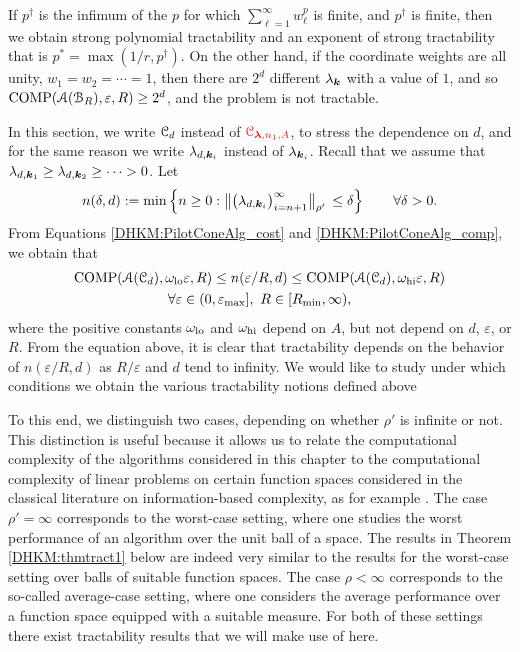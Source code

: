 \documentclass[USenglish]{article}
\theoremstyle{dgthm}
\theoremstyle{dgthm}
\theoremstyle{dgthm}
\theoremstyle{dgthm}
\theoremstyle{dgdef}
\theoremstyle{definition}
\DeclareMathOperator{\COMP}{COMP}
\newcommand{\bignorm}[2][{}]{\ensuremath{\bigl \lVert #2 \bigr \rVert}_{#1}}
\newcommand{\DHKMchange}[1]{{\color{red}{#1}}}
\begin{document}
{If $p^\dagger$ is the infimum of the $p$ for which $\sum_{\ell = 1}^{\infty} w_\ell^{p}$ is finite, and $p^\dagger$ is finite, then we obtain strong polynomial tractability and an exponent of strong tractability that is $p^* = \max(1/r,p^\dagger)$. On the other hand, if the coordinate weights are all unity,  $w_1 = w_2 = \cdots = 1$, then there are $2^d$ different $\lambda_{{\boldsymbol{k}}}$ with a value of $1$, and so $\COMP(\calA(\calB_{R}),\varepsilon,R) \ge 2^d$, and the problem is not tractable.
}

In this section, we write ${\mathcal{C}}_d$ instead of $\DHKMchange{\calC_{\boldsymbol{\lambda},n_1,A}}$, to stress the dependence on $d$, and for the same reason we write $\lambda_{d,{\boldsymbol{k}}_i}$ instead of $\lambda_{{\boldsymbol{k}}_i}$. Recall that we assume that 
$\lambda_{d,{\boldsymbol{k}}_1}\geq \lambda_{d,{\boldsymbol{k}}_2}\geq \cdots >0$. Let 
\[
n(\delta,d) :=\min \left \{n\ge 0: \bignorm[\rho']{\bigl(  \lambda_{d,\bsk_i}  \bigr)_{i = n+1}^{\infty}} \,
    \le \delta \right \} \qquad \forall \delta > 0.
\]
From 
Equations \eqref{DHKM:PilotConeAlg_cost} and \eqref{DHKM:PilotConeAlg_comp}, we obtain that 
\begin{multline*}
     \COMP(\calA(\calC_d),\omega_{\textup{lo}} \varepsilon,R) \le n(\varepsilon/R,d) \le 
        \COMP(\calA(\calC_d),\omega_{\textup{hi}} \varepsilon,R)  \\
        \forall \varepsilon \in (0, \varepsilon_{\max}], \ R \in [R_{\min}, \infty),
\end{multline*}
where the positive constants $\omega_{\textup{lo}}$ and $\omega_{\textup{hi}}$  depend on $A$, but not depend on $d$, $\varepsilon$, or $R$.  From the equation above, it is clear that tractability depends on the behavior of $n(\varepsilon/R,d)$ as $R/\varepsilon$ and $d$ tend to infinity. We would like to study under which conditions we obtain the various tractability notions defined above

To this end, we distinguish two cases, depending on whether $\rho'$ is infinite or not. This 
distinction is useful because it allows us to relate the computational complexity of the algorithms 
considered in this chapter to the computational complexity of linear problems on certain function spaces considered in the classical literature on information-based complexity, as for example \cite{NovWoz08a}. The case $\rho'=\infty$ corresponds to the
worst-case setting, where one studies the worst performance of an algorithm over the unit ball of 
a space. The results in Theorem \ref{DHKM:thmtract1} below are indeed very similar to the results 
for the worst-case setting over balls of suitable function spaces. The case $\rho<\infty$ corresponds to the so-called average-case setting, where one 
considers the average performance over a function space equipped with a suitable measure. 
For both of these settings there exist tractability results that we will make use of here.
\end{document}

